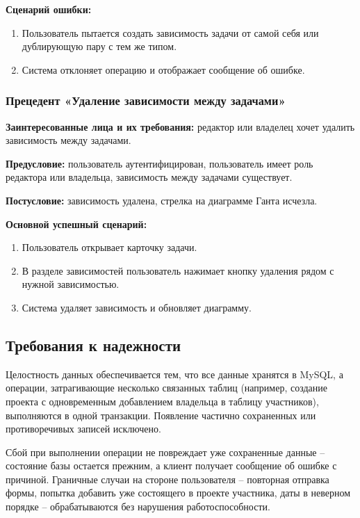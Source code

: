 \textbf{Сценарий ошибки:}
\begin{enumerate}
    \item Пользователь пытается создать зависимость задачи от самой себя или дублирующую пару с тем же типом.
    \item Система отклоняет операцию и отображает сообщение об ошибке.
\end{enumerate}

\subsubsection{Прецедент «Удаление зависимости между задачами»}

\textbf{Заинтересованные лица и их требования:} редактор или владелец хочет удалить зависимость между задачами.

\textbf{Предусловие:} пользователь аутентифицирован, пользователь имеет роль редактора или владельца, зависимость между задачами существует.

\textbf{Постусловие:} зависимость удалена, стрелка на диаграмме Ганта исчезла.

\textbf{Основной успешный сценарий:}
\begin{enumerate}
    \item Пользователь открывает карточку задачи.
    \item В разделе зависимостей пользователь нажимает кнопку удаления рядом с нужной зависимостью.
    \item Система удаляет зависимость и обновляет диаграмму.
\end{enumerate}

\subsection{Требования к надежности}

Целостность данных обеспечивается тем, что все данные хранятся в MySQL, а операции, затрагивающие несколько связанных таблиц (например, создание проекта с одновременным добавлением владельца в таблицу участников), выполняются в одной транзакции. Появление частично сохраненных или противоречивых записей исключено.

Сбой при выполнении операции не повреждает уже сохраненные данные -- состояние базы остается прежним, а клиент получает сообщение об ошибке с причиной. Граничные случаи на стороне пользователя -- повторная отправка формы, попытка добавить уже состоящего в проекте участника, даты в неверном порядке -- обрабатываются без нарушения работоспособности.

